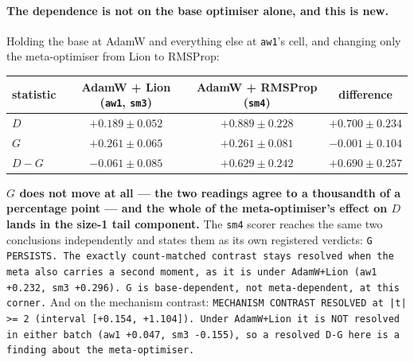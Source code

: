 \documentclass[10pt,letterpaper]{article}
\newcommand{\Dstat}{D}                         %
\newcommand{\Gstat}{G}                         %
\newcommand{\arm}[1]{\texttt{#1}}
\begin{document}
\paragraph{The dependence is not on the base optimiser alone, and this is new.}
Holding the base at AdamW and everything else at \arm{aw1}'s cell, and changing only the
meta-optimiser from Lion to RMSProp:

\begin{center}
\small
\begin{tabular}{@{}lccc@{}}
\toprule
statistic & AdamW + Lion (\arm{aw1}, \arm{sm3}) & AdamW + RMSProp (\arm{sm4}) & difference \\
\midrule
$\Dstat$ & $+0.189 \pm 0.052$ & $\mathbf{+0.889 \pm 0.228}$ & $\mathbf{+0.700 \pm 0.234}$ \\
$\Gstat$ & $+0.261 \pm 0.065$ & $\mathbf{+0.261 \pm 0.081}$ & $\mathbf{-0.001 \pm 0.104}$ \\
$\Dstat - \Gstat$ & $-0.061 \pm 0.085$ & $\mathbf{+0.629 \pm 0.242}$ &
  $\mathbf{+0.690 \pm 0.257}$ \\
\bottomrule
\end{tabular}
\end{center}

\textbf{$\Gstat$ does not move at all --- the two readings agree to a thousandth of a percentage
point --- and the whole of the meta-optimiser's effect on $\Dstat$ lands in the size-1 tail
component.} The \arm{sm4} scorer reaches the same two conclusions independently and states them as
its own registered verdicts: \texttt{G PERSISTS. The exactly count-matched contrast stays resolved
when the meta also carries a second moment, as it is under AdamW+Lion (aw1 +0.232, sm3 +0.296). G
is base-dependent, not meta-dependent, at this corner.} And on the mechanism contrast:
\texttt{MECHANISM CONTRAST RESOLVED at |t| >= 2 (interval [+0.154, +1.104]). Under AdamW+Lion it
is NOT resolved in either batch (aw1 +0.047, sm3 -0.155), so a resolved D-G here is a finding
about the meta-optimiser.}
\end{document}
